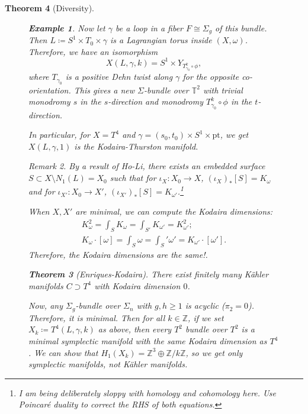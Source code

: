 \documentclass[leqno, openany]{memoir}
\newtheorem{thm}{Theorem}[chapter]
\theoremstyle{definition}
\newtheorem{exm}[thm]{Example}
\theoremstyle{remark}
\newtheorem{rmk}[thm]{Remark}
\theoremstyle{plain}
\theoremstyle{definition}
\theoremstyle{remark}
\newcommand{\Z}{\mathbb{Z}}
\newcommand{\T}{\mathbb{T}}
\newcommand{\mr}[1]{\mathrm{#1}}
\begin{document}
\begin{thm}[Diversity]
\begin{figure}[H]
\begin{exm}
        Now let $\gamma$ be a loop in a fiber $F \cong \Sigma_g$ of this
        bundle. Then $L \coloneqq S^1 \times T_0 \times \gamma$ is a Lagrangian
        torus inside $(X, \omega)$. Therefore, we have an isomorphism \[ X(L,
        \gamma, k) = S^1 \times Y_{T_{\gamma_0}^k \circ \phi}, \] where
        $T_{\gamma_0}$ is a positive Dehn twist along $\gamma$ for the opposite
        co-orientation. This gives a new $\Sigma$-bundle over $\T^2$ with
        trivial monodromy $s$ in the $s$-direction and monodromy
        $T_{\gamma_0}^k \circ \phi$ in the $t$-direction.

        In particular, for $X = T^4$ and $\gamma = (s_0,t_0) \times S^1 \times
    \mr{pt}$, we get $X(L, \gamma, 1)$ is the Kodaira-Thurston manifold.
\end{exm}

    \begin{rmk} By a result of Ho-Li, there exists an embedded surface $S
        \subset X \setminus N_1(L) = X_0$ such that for $\iota_X: X_0 \to X$,
        $(\iota_X)_* [S] = K_{\omega}$ and for $\iota_{X'}: X_0 \to X'$,
        $(\iota_{X'})_* [S] = K_{\omega'}$.\footnote{I am being deliberately
        sloppy with homology and cohomology here. Use Poincar\'e duality to
    correct the RHS of both equations.}

        When $X, X'$ are minimal, we can compute the Kodaira dimensions:
        \begin{align*} K^2_{\omega} = \int_S K_{\omega} = \int_{S'} K_{\omega'}
            = K_{\omega'}^2; \\ K_{\omega} \cdot [\omega] = \int_S \omega =
            \int_S' \omega' = K_{\omega'} \cdot [\omega'].  \end{align*}
        Therefore, the Kodaira dimensions are the \textit{same!}.  \end{rmk}

    \begin{thm}[Enriques-Kodaira] There exist finitely many K\"ahler manifolds
    $C \supset T^4$ with Kodaira dimension $0$.  \end{thm}

    Now, any $\Sigma_g$-bundle over $\Sigma_n$ with $g,h \geq 1$ is
    \textit{acyclic} ($\pi_2 = 0$). Therefore, it is minimal. Then for all $k
    \in \Z$, if we set $X_k \coloneqq T^4(L, \gamma, k)$ as above, then every
    $T^2$ bundle over $T^2$ is a minimal symplectic manifold with the same
    Kodaira dimension as $T^4$. We can show that $H_1(X_k) = \Z^3 \oplus
    \Z/k\Z$, so we get only symplectic manifolds, not K\"ahler manifolds.


\end{figure}
\end{thm}
\end{document}
